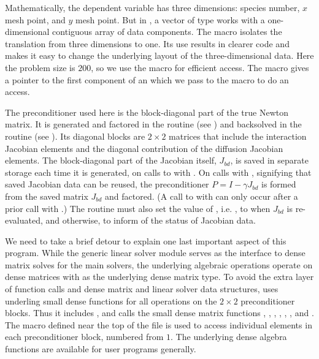 Mathematically, the dependent variable has three dimensions: species
number, $x$ mesh point, and $y$ mesh point.  But in {\nvecs}, a vector of
type  works with a one-dimensional contiguous array of
data components. The macro  isolates the translation from
three dimensions to one. Its use results in clearer code and makes it
easy to change the underlying layout of the three-dimensional data. 
Here the problem size is $200$, so we use the  macro
for efficient  access.  The  macro gives
a pointer to the first component of an  which we pass to
the  macro to do an  access.

The preconditioner used here is the block-diagonal part of the true Newton
matrix.  It is generated and factored in the  routine 
(see ) and backsolved in the  routine 
(see ). Its diagonal blocks are $2 \times 2$
matrices that include the interaction Jacobian elements and the diagonal
contribution of the diffusion Jacobian elements.  The block-diagonal part of
the Jacobian itself, $J_{bd}$, is saved in separate storage each time it is
generated, on calls to  with .
On calls with , signifying that saved Jacobian data
can be reused, the preconditioner $P = I - \gamma J_{bd}$ is formed from the
saved matrix $J_{bd}$ and factored.  (A call to  with
 can only occur after a prior call with
.)  The  routine must also set the value
of , i.e. , to  when $J_{bd}$ is re-evaluated,
and  otherwise, to inform {\cvspils} of the status of Jacobian data.

We need to take a brief detour to explain one last important aspect of
this program.  While the generic {\sunlinsoldense} linear solver
module serves as the interface to dense matrix solves for the main
{\sundials} solvers, the underlying algebraic operations operate on
dense matrices with  as the underlying dense matrix
type.  To avoid the extra layer of function calls and dense matrix and
linear solver data structures,  uses underling small
dense functions for all operations on the $2 \times 2$ preconditioner blocks.  
Thus it includes , and calls the small dense
matrix functions , , ,
, , , and
. The macro  defined near the top of the file
is used to access individual elements in each preconditioner block,
numbered from $1$.  The underlying dense algebra functions are
available for {\cvode} user programs
generally.%

